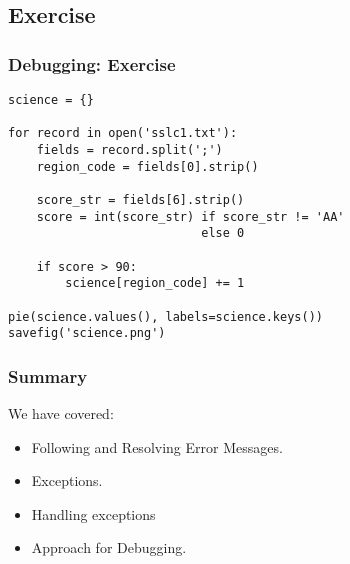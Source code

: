 \documentclass[compress,14pt]{beamer}
\newcounter{time}
\newcommand{\inctime}[1]{\addtocounter{time}{#1}{\vspace*{0.1in}\tiny \thetime\ m}}
\begin{document}
\subsection{Exercise}
\begin{frame}[fragile]
\frametitle{Debugging: Exercise}
\small
\begin{lstlisting}
science = {}

for record in open('sslc1.txt'):
    fields = record.split(';')
    region_code = fields[0].strip()

    score_str = fields[6].strip()
    score = int(score_str) if score_str != 'AA' 
                           else 0

    if score > 90:
        science[region_code] += 1

pie(science.values(), labels=science.keys())
savefig('science.png')
\end{lstlisting}
\inctime{10}
\end{frame}

\begin{frame}
  \frametitle{Summary}
We have covered:
  \begin{itemize}
  \item Following and Resolving Error Messages.
  \item Exceptions.
  \item Handling exceptions
  \item Approach for Debugging.
  \end{itemize}
\end{frame}
\end{document}

